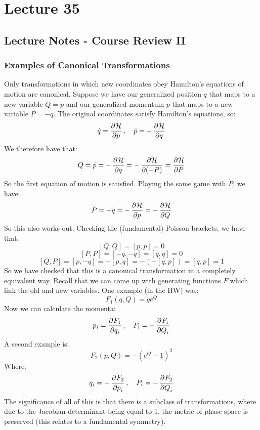 \documentclass[../PHYS306Notes.tex]{subfiles}
\begin{document}
\section{Lecture 35}
\subsection{Lecture Notes - Course Review II}
\subsubsection{Examples of Canonical Transformations}
Only transformations in which new coordinates obey Hamilton's equations of motion are canonical. Suppose we have our generalized position $q$ that maps to a new variable $Q = p$ and our generalized momentum $p$ that maps to a new variable $P = -q$. The original coordinates satisfy Hamilton's equations, so:
\[\dot{q} = \dpd{\HH}{p}, \quad \dot{p} = -\dpd{\HH}{q}\]
We therefore have that:
\[\dot{Q} = \dot{p} = -\dpd{\HH}{q} = -\dpd{\HH}{(-P)} = \dpd{\HH}{P}\]
So the first equation of motion is satisfied. Playing the same game with $\dot{P}$, we have:
\[\dot{P} = -\dot{q} = -\dpd{\HH}{p} = -\dpd{\HH}{Q}\]
So this also works out. Checking the (fundamental) Poisson brackets, we have that:
\[[Q, Q] = [p, p] = 0\]
\[[P, P] = [-q, -q] = [q, q] = 0\]
\[[Q, P] = [p, -q] = -[p, q] = -(-[q, p]) = [q, p] = 1\]
So we have checked that this is a canonical transformation in a completely equivalent way. Recall that we can come up with generating functions $F$ which link the old and new variables. One example (in the HW) was:
\[F_1(q, Q) = qe^Q\]
Now we can calculate the momenta:
\[p_i = \dpd{F_1}{q_i}, \quad P_i = -\dpd{F_i}{Q_i}\]
A second example is:
\[F_2(p, Q) = -(e^Q - 1)^2\]
Where:
\[q_i = -\dpd{F_2}{p_i}, \quad P_i = -\dpd{F_2}{Q_i}\]
The significance of all of this is that there is a subclass of transformations, where due to the Jacobian determinant being equal to 1, the metric of phase space is preserved (this relates to a fundamental symmetry). 
\end{document}
